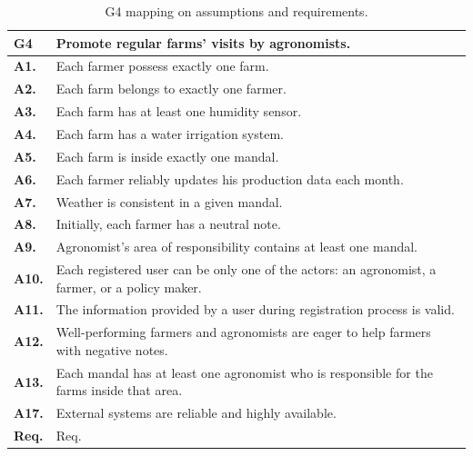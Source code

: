 \begin{table}[H]
    \centering
    \begin{tabularx}{\linewidth}{lX} \toprule
        \textbf{G4} & Promote regular farms’ visits by agronomists. \\ 
        \midrule
        \textbf{A1.} & Each farmer possess exactly one farm.\\
        \textbf{A2.} & Each farm belongs to exactly one farmer.\\ 
        \textbf{A3.} & Each farm has at least one humidity sensor.\\ 
        \textbf{A4.} & Each farm has a water irrigation system.\\ 
        \textbf{A5.} & Each farm is inside exactly one mandal.\\ 
        \textbf{A6.} & Each farmer reliably updates his production data each month.\\ 
        \textbf{A7.} & Weather is consistent in a given mandal.\\ 
        \textbf{A8.} & Initially, each farmer has a neutral note.\\ 
        \textbf{A9.} & Agronomist's area of responsibility contains at least one mandal.\\ 
        \textbf{A10.} & Each registered user can be only one of the actors: an agronomist, a farmer, or a policy maker.\\ 
        \textbf{A11.} & The information provided by a user during registration process is valid.\\ 
        \textbf{A12.} & Well-performing farmers and agronomists are eager to help farmers with negative notes.\\ 
        \textbf{A13.} & Each mandal has at least one agronomist who is responsible for the farms inside that area.\\ 
        \textbf{A17.} & External systems are reliable and highly available.\\
        \midrule
        \textbf{Req.} & Req.\\
        \bottomrule
    \end{tabularx}
    \caption{G4 mapping on assumptions and requirements.}
\end{table}

